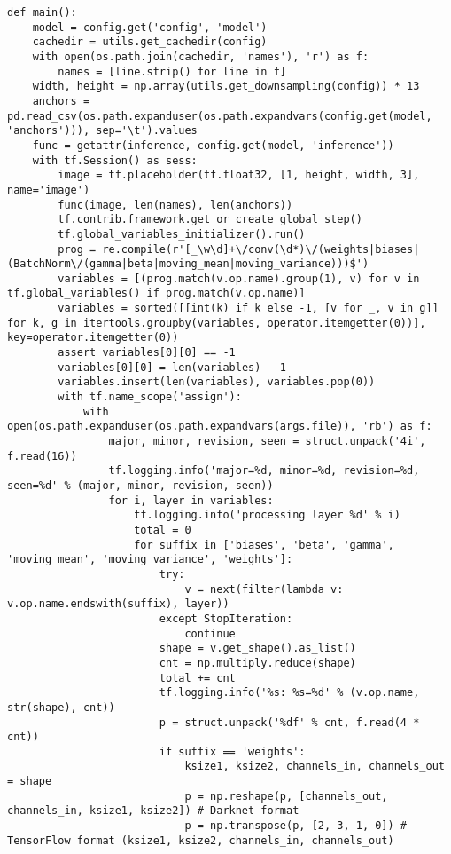 \begin{lstlisting}
def main():
    model = config.get('config', 'model')
    cachedir = utils.get_cachedir(config)
    with open(os.path.join(cachedir, 'names'), 'r') as f:
        names = [line.strip() for line in f]
    width, height = np.array(utils.get_downsampling(config)) * 13
    anchors = pd.read_csv(os.path.expanduser(os.path.expandvars(config.get(model, 'anchors'))), sep='\t').values
    func = getattr(inference, config.get(model, 'inference'))
    with tf.Session() as sess:
        image = tf.placeholder(tf.float32, [1, height, width, 3], name='image')
        func(image, len(names), len(anchors))
        tf.contrib.framework.get_or_create_global_step()
        tf.global_variables_initializer().run()
        prog = re.compile(r'[_\w\d]+\/conv(\d*)\/(weights|biases|(BatchNorm\/(gamma|beta|moving_mean|moving_variance)))$')
        variables = [(prog.match(v.op.name).group(1), v) for v in tf.global_variables() if prog.match(v.op.name)]
        variables = sorted([[int(k) if k else -1, [v for _, v in g]] for k, g in itertools.groupby(variables, operator.itemgetter(0))], key=operator.itemgetter(0))
        assert variables[0][0] == -1
        variables[0][0] = len(variables) - 1
        variables.insert(len(variables), variables.pop(0))
        with tf.name_scope('assign'):
            with open(os.path.expanduser(os.path.expandvars(args.file)), 'rb') as f:
                major, minor, revision, seen = struct.unpack('4i', f.read(16))
                tf.logging.info('major=%d, minor=%d, revision=%d, seen=%d' % (major, minor, revision, seen))
                for i, layer in variables:
                    tf.logging.info('processing layer %d' % i)
                    total = 0
                    for suffix in ['biases', 'beta', 'gamma', 'moving_mean', 'moving_variance', 'weights']:
                        try:
                            v = next(filter(lambda v: v.op.name.endswith(suffix), layer))
                        except StopIteration:
                            continue
                        shape = v.get_shape().as_list()
                        cnt = np.multiply.reduce(shape)
                        total += cnt
                        tf.logging.info('%s: %s=%d' % (v.op.name, str(shape), cnt))
                        p = struct.unpack('%df' % cnt, f.read(4 * cnt))
                        if suffix == 'weights':
                            ksize1, ksize2, channels_in, channels_out = shape
                            p = np.reshape(p, [channels_out, channels_in, ksize1, ksize2]) # Darknet format
                            p = np.transpose(p, [2, 3, 1, 0]) # TensorFlow format (ksize1, ksize2, channels_in, channels_out)

\end{lstlisting}
